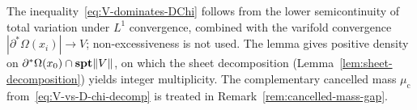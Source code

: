 The inequality~\eqref{eq:V-dominates-DChi} follows from the lower semicontinuity of total variation under $L^1$ convergence, combined with the varifold convergence $|\partial^*\Omega(x_i)| \to V$; non-excessiveness is not used. The lemma gives positive density on $\partial^*\Omega(x_0) \cap \mathbf{spt}\|V\|$, on which the sheet decomposition (Lemma~\ref{lem:sheet-decomposition}) yields integer multiplicity. The complementary cancelled mass $\mu_{\mathrm{c}}$ from~\eqref{eq:V-vs-D-chi-decomp} is treated in Remark~\ref{rem:cancelled-mass-gap}.


